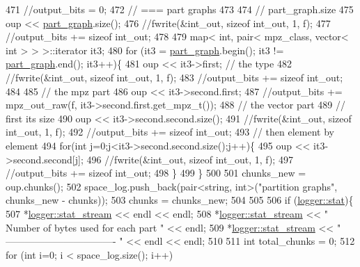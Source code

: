 \begin{DoxyCode}
471   \textcolor{comment}{//output\_bits = 0;}
472   \textcolor{comment}{// === part graphs}
473 
474   \textcolor{comment}{// part\_graph.size}
475   oup <<  \hyperlink{classmarked__graph__compressed_ae179a4737e6eab905c18a94d44ef64b7}{part\_graph}.size();
476   \textcolor{comment}{//fwrite(&int\_out, sizeof int\_out, 1, f);}
477   \textcolor{comment}{//output\_bits += sizeof int\_out;}
478 
479   map< int, pair< mpz\_class, vector< int > > >::iterator it3;
480   \textcolor{keywordflow}{for} (it3 = \hyperlink{classmarked__graph__compressed_ae179a4737e6eab905c18a94d44ef64b7}{part\_graph}.begin(); it3 != \hyperlink{classmarked__graph__compressed_ae179a4737e6eab905c18a94d44ef64b7}{part\_graph}.end(); it3++)\{
481     oup <<  it3->first; \textcolor{comment}{// the type}
482     \textcolor{comment}{//fwrite(&int\_out, sizeof int\_out, 1, f);}
483     \textcolor{comment}{//output\_bits += sizeof int\_out;}
484 
485     \textcolor{comment}{// the mpz part}
486     oup << it3->second.first;
487     \textcolor{comment}{//output\_bits += mpz\_out\_raw(f, it3->second.first.get\_mpz\_t());}
488     \textcolor{comment}{// the vector part}
489     \textcolor{comment}{// first its size}
490     oup <<  it3->second.second.size();
491     \textcolor{comment}{//fwrite(&int\_out, sizeof int\_out, 1, f);}
492     \textcolor{comment}{//output\_bits += sizeof int\_out;}
493     \textcolor{comment}{// then element by element}
494     \textcolor{keywordflow}{for}(\textcolor{keywordtype}{int} j=0;j<it3->second.second.size();j++)\{
495       oup <<  it3->second.second[j];
496       \textcolor{comment}{//fwrite(&int\_out, sizeof int\_out, 1, f);}
497       \textcolor{comment}{//output\_bits += sizeof int\_out;}
498     \}
499   \}
500 
501   chunks\_new = oup.chunks();
502   space\_log.push\_back(pair<string, int>(\textcolor{stringliteral}{"partition graphs"}, chunks\_new - chunks));
503   chunks = chunks\_new;
504 
505   
506   \textcolor{keywordflow}{if} (\hyperlink{classlogger_a26812b5ba03f130e8dae3446d5fc032f}{logger::stat})\{
507     *\hyperlink{classlogger_a7db37821f875f2ba3540980b355779f5}{logger::stat\_stream} << endl << endl;
508     *\hyperlink{classlogger_a7db37821f875f2ba3540980b355779f5}{logger::stat\_stream} << \textcolor{stringliteral}{" Number of bytes used for each part "} << endl;
509     *\hyperlink{classlogger_a7db37821f875f2ba3540980b355779f5}{logger::stat\_stream} << \textcolor{stringliteral}{" ---------------------------------- "} << endl << endl;
510 
511     \textcolor{keywordtype}{int} total\_chunks = 0;
512     \textcolor{keywordflow}{for} (\textcolor{keywordtype}{int} i=0; i < space\_log.size(); i++)

\end{DoxyCode}

